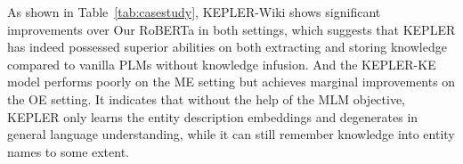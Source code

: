As shown in Table~\ref{tab:casestudy}, KEPLER-Wiki shows significant improvements over Our RoBERTa in both settings, which suggests that KEPLER has indeed possessed superior abilities on both extracting and storing knowledge compared to vanilla PLMs without knowledge infusion. And the KEPLER-KE model performs poorly on the ME setting but achieves marginal improvements on the OE setting. It indicates that without the help of the MLM objective, KEPLER only learns the entity description embeddings and degenerates in general language understanding, while it can still remember knowledge into entity names to some extent.

